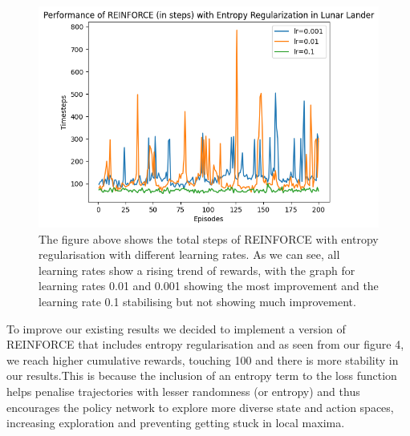 \documentclass{article}
\begin{document}
\begin{figure}[h!]
\centering
\includegraphics[width=0.85\linewidth]{Report/images/05.Performance_of_REINFORCE_with_ER_Steps.png}
\caption{\label{fig:ReinforceEntropy_Rewards_Steps}The figure above shows the total steps of REINFORCE with entropy regularisation with different learning rates. As we can see, all learning rates show a rising trend of rewards, with the graph for learning rates 0.01 and 0.001 showing the most improvement and the learning rate 0.1 stabilising but not showing much improvement. }
\end{figure}
\par To improve our existing results we decided to implement a version of REINFORCE that includes entropy regularisation and as seen from our figure 4, we reach higher cumulative rewards, touching 100 and there is more stability in our results.This is because the inclusion of an entropy term to the loss function helps penalise trajectories with lesser randomness (or entropy) and thus encourages the policy network to explore more diverse state and action spaces, increasing exploration and preventing getting stuck in local maxima. 
  
\end{document}

